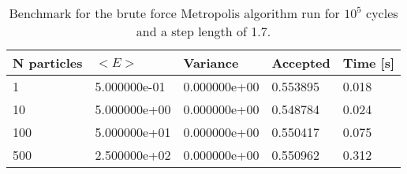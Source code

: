 \begin{table}[h!]
\begin{tabular}{|l|l|l|l|l|}
\hline 
N particles & $<E>$ & Variance & Accepted & Time [s]\\ 
 \hline 
1 & 5.000000e-01 & 0.000000e+00 & 0.553895 & 0.018 \\ \hline 
10 & 5.000000e+00 & 0.000000e+00 & 0.548784 & 0.024 \\ \hline 
100 & 5.000000e+01 & 0.000000e+00 & 0.550417 & 0.075 \\ \hline 
500 & 2.500000e+02 & 0.000000e+00 & 0.550962 & 0.312 \\ \hline 
\end{tabular}
\caption{%
  Benchmark for the brute force Metropolis algorithm run for %
  $10^5$ cycles and a step length of 1.7.%
}
\label{tab:ha1} 
\end{table} 
